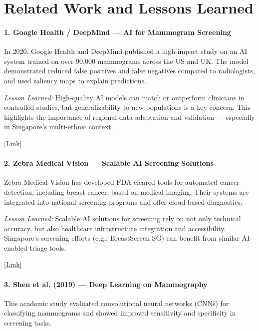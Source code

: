 \documentclass[12pt]{article}
\begin{document}
\section*{Related Work and Lessons Learned}

\paragraph{1. Google Health / DeepMind — AI for Mammogram Screening}
In 2020, Google Health and DeepMind published a high-impact study on an AI system trained on over 90,000 mammograms across the US and UK. The model demonstrated reduced false positives and false negatives compared to radiologists, and used saliency maps to explain predictions.

\textit{Lesson Learned:}
High-quality AI models can match or outperform clinicians in controlled studies, but generalizability to new populations is a key concern. This highlights the importance of regional data adaptation and validation — especially in Singapore’s multi-ethnic context.

\href{https://deepmind.google/discover/blog/international-evaluation-of-an-ai-system-for-breast-cancer-screening/}{[Link]}

\vspace{0.5em}

\paragraph{2. Zebra Medical Vision — Scalable AI Screening Solutions}
Zebra Medical Vision has developed FDA-cleared tools for automated cancer detection, including breast cancer, based on medical imaging. Their systems are integrated into national screening programs and offer cloud-based diagnostics.

\textit{Lesson Learned:}
Scalable AI solutions for screening rely on not only technical accuracy, but also healthcare infrastructure integration and accessibility. Singapore’s screening efforts (e.g., BreastScreen SG) can benefit from similar AI-enabled triage tools.

\href{https://medium.com/data-science/how-zebra-medical-vision-developed-clinical-ai-solutions-34b385617b65}{[Link]}

\vspace{0.5em}

\paragraph{3. Shen et al. (2019) — Deep Learning on Mammography}
This academic study evaluated convolutional neural networks (CNNs) for classifying mammograms and showed improved sensitivity and specificity in screening tasks.
\end{document}
